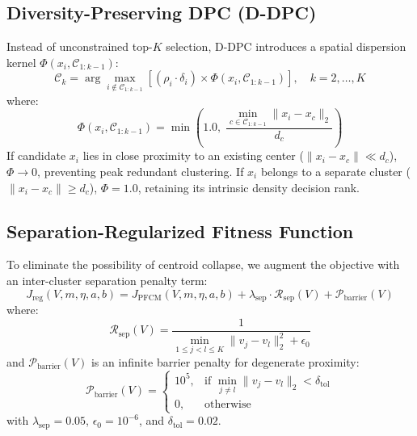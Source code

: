 \documentclass[preprint,12pt]{elsarticle}
\begin{document}
\subsection{Diversity-Preserving DPC (D-DPC)}
Instead of unconstrained top-$K$ selection, D-DPC introduces a spatial dispersion kernel $\Phi(x_i, \mathcal{C}_{1:k-1})$:
\begin{equation}
\mathcal{C}_k = \arg\max_{i \notin \mathcal{C}_{1:k-1}} \left[ (\rho_i \cdot \delta_i) \times \Phi(x_i, \mathcal{C}_{1:k-1}) \right], \quad k = 2, \dots, K
\label{eq:ddpc}
\end{equation}
where:
\begin{equation}
\Phi(x_i, \mathcal{C}_{1:k-1}) = \min\left( 1.0, \; \frac{\displaystyle \min_{c \in \mathcal{C}_{1:k-1}} \|x_i - x_c\|_2}{d_c} \right)
\end{equation}
If candidate $x_i$ lies in close proximity to an existing center ($\|x_i - x_c\| \ll d_c$), $\Phi \to 0$, preventing peak redundant clustering. If $x_i$ belongs to a separate cluster ($\|x_i - x_c\| \ge d_c$), $\Phi = 1.0$, retaining its intrinsic density decision rank.

\subsection{Separation-Regularized Fitness Function}
To eliminate the possibility of centroid collapse, we augment the objective with an inter-cluster separation penalty term:
\begin{equation}
J_{\text{reg}}(V, m, \eta, a, b) = J_{\text{PFCM}}(V, m, \eta, a, b) + \lambda_{\text{sep}} \cdot \mathcal{R}_{\text{sep}}(V) + \mathcal{P}_{\text{barrier}}(V)
\label{eq:reg_obj}
\end{equation}
where:
\begin{equation}
\mathcal{R}_{\text{sep}}(V) = \frac{1}{\displaystyle \min_{1 \le j < l \le K} \|v_j - v_l\|_2^2 + \epsilon_0}
\end{equation}
and $\mathcal{P}_{\text{barrier}}(V)$ is an infinite barrier penalty for degenerate proximity:
\begin{equation}
\mathcal{P}_{\text{barrier}}(V) = \begin{cases}
10^5, & \text{if } \displaystyle \min_{j \neq l} \|v_j - v_l\|_2 < \delta_{\text{tol}} \\
0, & \text{otherwise}
\end{cases}
\end{equation}
with $\lambda_{\text{sep}} = 0.05$, $\epsilon_0 = 10^{-6}$, and $\delta_{\text{tol}} = 0.02$.
\end{document}
